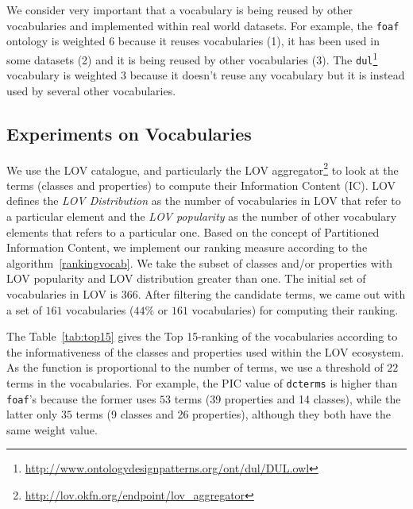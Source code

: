 \begin{description}
We consider very important that a vocabulary is being reused by other vocabularies and implemented within real world datasets. For example, the \texttt{foaf} ontology is weighted $6$ because it reuses vocabularies (1), it has been used in some datasets (2) and it is being reused by other vocabularies (3). The \texttt{dul}\footnote{\url{http://www.ontologydesignpatterns.org/ont/dul/DUL.owl}} vocabulary is weighted $3$ because it doesn't reuse any vocabulary but it is instead used by several other vocabularies.



\subsection{Experiments on Vocabularies}
\label{sec:experiments}
We use the LOV catalogue, and particularly the LOV aggregator\footnote{\url{http://lov.okfn.org/endpoint/lov_aggregator}} to look at the terms (classes and properties) to compute their Information Content (IC). LOV defines the \textit{LOV Distribution} as the number of vocabularies in LOV that refer to a particular element and the \textit{LOV popularity} as the number of other vocabulary elements that refers to a particular one. Based on the concept of Partitioned Information Content, we implement our ranking measure according to the algorithm~\ref{rankingvocab}. We take the subset of classes and/or properties with LOV popularity and LOV distribution greater than one. The initial set of vocabularies in LOV is $366$. After filtering the candidate terms, we came out with a set of $161$ vocabularies ($44\%$ or $161$ vocabularies) for computing their ranking.

The Table~\ref{tab:top15} gives the Top 15-ranking of the vocabularies according to the informativeness of the classes and properties used within the LOV ecosystem. As the function is proportional to the number of terms, we use a threshold of $22$ terms in the vocabularies. For example, the PIC value of \texttt{dcterms} is higher than \texttt{foaf}'s because the former uses $53$ terms (39 properties and 14 classes), while the latter only $35$ terms (9 classes and 26 properties), although they both have the same weight value.


\end{description}
